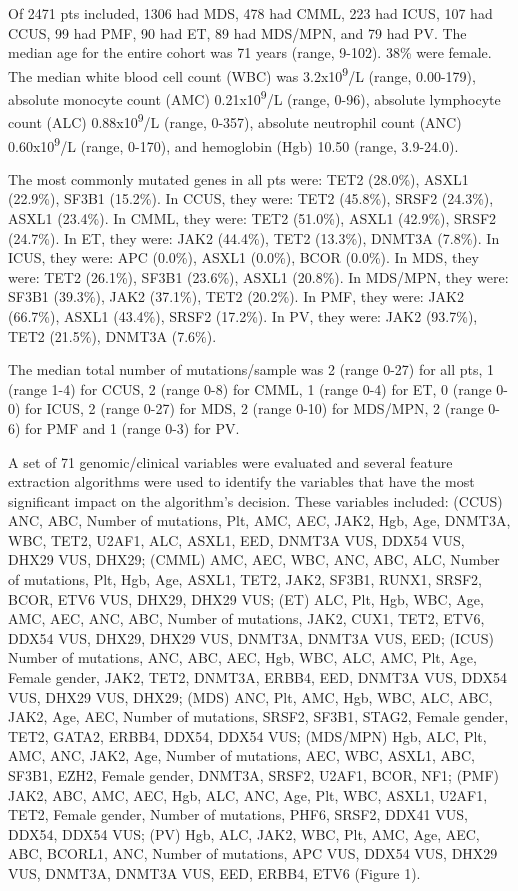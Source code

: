 Of 2471 pts included, 1306 had MDS, 478 had CMML, 223 had ICUS, 107 had CCUS, 99 had PMF, 90 had ET, 89 had MDS/MPN, and 79 had PV. The median age for the entire cohort was 71 years (range, 9-102). 38\% were female. The median white blood cell count (WBC) was 3.2x10\textsuperscript{9}/L (range, 0.00-179), absolute monocyte count (AMC) 0.21x10\textsuperscript{9}/L (range, 0-96), absolute lymphocyte count (ALC) 0.88x10\textsuperscript{9}/L (range, 0-357), absolute neutrophil count (ANC) 0.60x10\textsuperscript{9}/L (range, 0-170), and hemoglobin (Hgb) 10.50 (range, 3.9-24.0). 

The most commonly mutated genes in all pts were: TET2 (28.0\%), ASXL1 (22.9\%), SF3B1 (15.2\%). In CCUS, they were: TET2 (45.8\%), SRSF2 (24.3\%), ASXL1 (23.4\%). In CMML, they were: TET2 (51.0\%), ASXL1 (42.9\%), SRSF2 (24.7\%). In ET, they were: JAK2 (44.4\%), TET2 (13.3\%), DNMT3A (7.8\%). In ICUS, they were: APC (0.0\%), ASXL1 (0.0\%), BCOR (0.0\%). In MDS, they were: TET2 (26.1\%), SF3B1 (23.6\%), ASXL1 (20.8\%). In MDS/MPN, they were: SF3B1 (39.3\%), JAK2 (37.1\%), TET2 (20.2\%). In PMF, they were: JAK2 (66.7\%), ASXL1 (43.4\%), SRSF2 (17.2\%). In PV, they were: JAK2 (93.7\%), TET2 (21.5\%), DNMT3A (7.6\%).

The median total number of mutations/sample was 2 (range 0-27) for all pts, 1 (range 1-4) for CCUS, 2 (range 0-8) for CMML, 1 (range 0-4) for ET, 0 (range 0-0) for ICUS, 2 (range 0-27) for MDS, 2 (range 0-10) for MDS/MPN, 2 (range 0-6) for PMF and 1 (range 0-3) for PV.


A set of 71 genomic/clinical variables were evaluated and several feature extraction algorithms were used to identify the variables that have the most significant impact on the algorithm's decision. These variables included: (CCUS) ANC, ABC, Number of mutations, Plt, AMC, AEC, JAK2, Hgb, Age, DNMT3A, WBC, TET2, U2AF1, ALC, ASXL1, EED, DNMT3A VUS, DDX54 VUS, DHX29 VUS, DHX29; (CMML) AMC, AEC, WBC, ANC, ABC, ALC, Number of mutations, Plt, Hgb, Age, ASXL1, TET2, JAK2, SF3B1, RUNX1, SRSF2, BCOR, ETV6 VUS, DHX29, DHX29 VUS; (ET) ALC, Plt, Hgb, WBC, Age, AMC, AEC, ANC, ABC, Number of mutations, JAK2, CUX1, TET2, ETV6, DDX54 VUS, DHX29, DHX29 VUS, DNMT3A, DNMT3A VUS, EED; (ICUS) Number of mutations, ANC, ABC, AEC, Hgb, WBC, ALC, AMC, Plt, Age, Female gender, JAK2, TET2, DNMT3A, ERBB4, EED, DNMT3A VUS, DDX54 VUS, DHX29 VUS, DHX29; (MDS) ANC, Plt, AMC, Hgb, WBC, ALC, ABC, JAK2, Age, AEC, Number of mutations, SRSF2, SF3B1, STAG2, Female gender, TET2, GATA2, ERBB4, DDX54, DDX54 VUS; (MDS/MPN) Hgb, ALC, Plt, AMC, ANC, JAK2, Age, Number of mutations, AEC, WBC, ASXL1, ABC, SF3B1, EZH2, Female gender, DNMT3A, SRSF2, U2AF1, BCOR, NF1; (PMF) JAK2, ABC, AMC, AEC, Hgb, ALC, ANC, Age, Plt, WBC, ASXL1, U2AF1, TET2, Female gender, Number of mutations, PHF6, SRSF2, DDX41 VUS, DDX54, DDX54 VUS; (PV) Hgb, ALC, JAK2, WBC, Plt, AMC, Age, AEC, ABC, BCORL1, ANC, Number of mutations, APC VUS, DDX54 VUS, DHX29 VUS, DNMT3A, DNMT3A VUS, EED, ERBB4, ETV6 (Figure 1).

